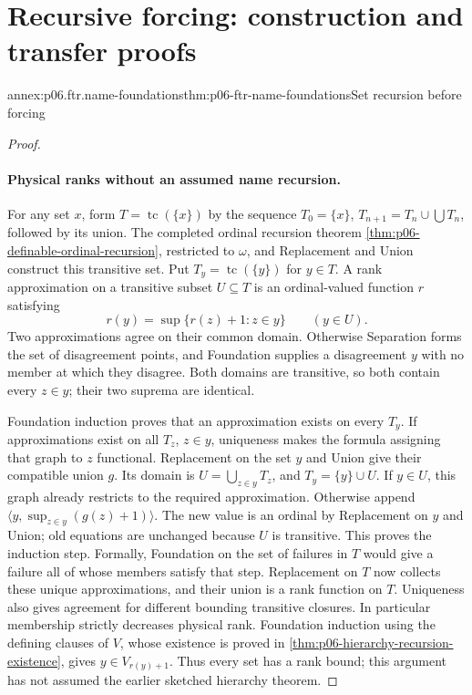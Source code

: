 \section{Recursive forcing: construction and transfer proofs}
\label{sec:annex-p06-forcing-recursion-truth}

\begin{annexitem}{annex:p06.ftr.name-foundations}{thm:p06-ftr-name-foundations}{Set recursion before forcing}
\begin{proof}
\paragraph{Physical ranks without an assumed name recursion.}
For any set \(x\), form \(T=\operatorname{tc}(\{x\})\) by the sequence
\(T_0=\{x\}\), \(T_{n+1}=T_n\cup\bigcup T_n\), followed by its union.
The completed ordinal recursion theorem
\cref{thm:p06-definable-ordinal-recursion}, restricted to \(\omega\),
and Replacement and Union construct this transitive set.
Put \(T_y=\operatorname{tc}(\{y\})\) for \(y\in T\).
A rank approximation on a transitive subset \(U\subseteq T\) is an
ordinal-valued function \(r\) satisfying
\[
 r(y)=\sup\{r(z)+1:z\in y\}\qquad(y\in U).
\]
Two approximations agree on their common domain. Otherwise Separation forms
the set of disagreement points, and Foundation supplies a disagreement
\(y\) with no member at which they disagree. Both domains are transitive,
so both contain every \(z\in y\); their two suprema are identical.

Foundation induction proves that an approximation exists on every \(T_y\).
If approximations exist on all \(T_z\), \(z\in y\), uniqueness makes
the formula assigning that graph to \(z\) functional. Replacement on the
set \(y\) and Union give their compatible union \(g\). Its domain is
\(U=\bigcup_{z\in y}T_z\), and \(T_y=\{y\}\cup U\).
If \(y\in U\), this graph already restricts to the required approximation.
Otherwise append \(\langle y,\sup_{z\in y}(g(z)+1)\rangle\).
The new value is an ordinal by Replacement on \(y\) and Union; old
equations are unchanged because \(U\) is transitive. This proves the
induction step. Formally, Foundation on the set of failures in \(T\)
would give a failure all of whose members satisfy that step.
Replacement on \(T\) now collects these unique approximations, and their
union is a rank function on \(T\). Uniqueness also gives agreement for
different bounding transitive closures. In particular membership strictly
decreases physical rank. Foundation induction using the defining clauses
of \(V\), whose existence is proved in
\cref{thm:p06-hierarchy-recursion-existence}, gives
\(y\in V_{r(y)+1}\). Thus every set has a rank bound; this argument has
not assumed the earlier sketched hierarchy theorem.


\end{proof}
\end{annexitem}
